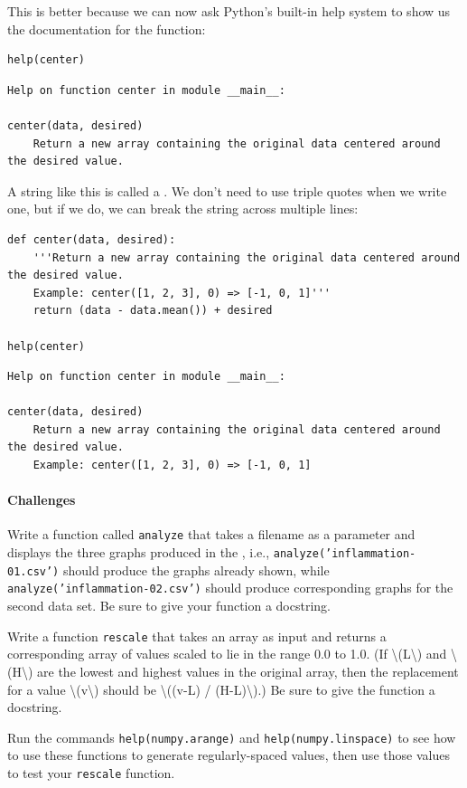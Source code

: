 \documentclass{book}
\begin{document}
This is better because we can now ask Python's built-in help system to
show us the documentation for the function:

\begin{verbatim}
help(center)
\end{verbatim}

\begin{verbatim}
Help on function center in module __main__:

center(data, desired)
    Return a new array containing the original data centered around the desired value.
\end{verbatim}

A string like this is called a . We
don't need to use triple quotes when we write one, but if we do, we can
break the string across multiple lines:

\begin{verbatim}
def center(data, desired):
    '''Return a new array containing the original data centered around the desired value.
    Example: center([1, 2, 3], 0) => [-1, 0, 1]'''
    return (data - data.mean()) + desired

help(center)
\end{verbatim}

\begin{verbatim}
Help on function center in module __main__:

center(data, desired)
    Return a new array containing the original data centered around the desired value.
    Example: center([1, 2, 3], 0) => [-1, 0, 1]
\end{verbatim}

\mbox{}\paragraph{Challenges}

\begin{swcenumerate}
\item
  Write a function called \texttt{analyze} that takes a filename as a
  parameter and displays the three graphs produced in the
  , i.e.,
  \texttt{analyze('inflammation-01.csv')} should produce the graphs
  already shown, while \texttt{analyze('inflammation-02.csv')} should
  produce corresponding graphs for the second data set. Be sure to give
  your function a docstring.
\item
  Write a function \texttt{rescale} that takes an array as input and
  returns a corresponding array of values scaled to lie in the range 0.0
  to 1.0. (If \textbackslash{}(L\textbackslash{}) and
  \textbackslash{}(H\textbackslash{}) are the lowest and highest values
  in the original array, then the replacement for a value
  \textbackslash{}(v\textbackslash{}) should be \textbackslash{}((v-L) /
  (H-L)\textbackslash{}).) Be sure to give the function a docstring.
\item
  Run the commands \texttt{help(numpy.arange)} and
  \texttt{help(numpy.linspace)} to see how to use these functions to
  generate regularly-spaced values, then use those values to test your
  \texttt{rescale} function.
\end{swcenumerate}
\end{document}
